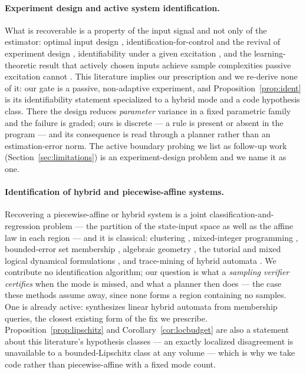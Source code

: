 \paragraph{Experiment design and active system identification.} What is recoverable is a property of the input signal and not only of the estimator: optimal input design \citep{mehra1974optimal}, identification-for-control and the revival of experiment design \citep{gevers2005identification}, identifiability under a given excitation \citep{ljung1999sysid}, and the learning-theoretic result that actively chosen inputs achieve sample complexities passive excitation cannot \citep{wagenmaker2020active}. This literature implies our prescription and we re-derive none of it: our gate is a passive, non-adaptive experiment, and Proposition~\ref{prop:ident} is its identifiability statement specialized to a hybrid mode and a code hypothesis class. There the design reduces \emph{parameter} variance in a fixed parametric family and the failure is graded; ours is discrete --- a rule is present or absent in the program --- and its consequence is read through a planner rather than an estimation-error norm. The active boundary probing we list as follow-up work (Section~\ref{sec:limitations}) is an experiment-design problem and we name it as one.

\paragraph{Identification of hybrid and piecewise-affine systems.} Recovering a piecewise-affine or hybrid system is a joint classification-and-regression problem --- the partition of the state-input space as well as the affine law in each region --- and it is classical: clustering \citep{ferraritrecate2003clustering}, mixed-integer programming \citep{roll2004identification}, bounded-error set membership \citep{bemporad2005boundederror}, algebraic geometry \citep{vidal2003algebraic}, the tutorial and mixed logical dynamical formulations \citep{paoletti2007hybrid,bemporad1999control}, and trace-mining of hybrid automata \citep{medhat2015mining,soto2021synthesis}. We contribute no identification algorithm; our question is what a \emph{sampling verifier certifies} when the mode is missed, and what a planner then does --- the case these methods assume away, since none forms a region containing no samples. One is already active: \citet{soto2019membership} synthesizes linear hybrid automata from membership queries, the closest existing form of the fix we prescribe. Proposition~\ref{prop:lipschitz} and Corollary~\ref{cor:locbudget} are also a statement about this literature's hypothesis classes --- an exactly localized disagreement is unavailable to a bounded-Lipschitz class at any volume --- which is why we take code rather than piecewise-affine with a fixed mode count.

